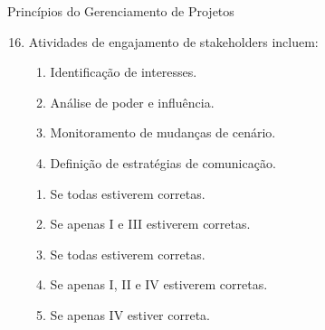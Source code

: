 \documentclass{beamer}
\begin{document}
\begin{frame}{Princípios do Gerenciamento de Projetos}
	\begin{enumerate}
		\setcounter{enumi}{15}
		\justifying
		\item Atividades de engajamento de stakeholders incluem:
		\begin{enumerate}[I]
			\item Identificação de interesses.
			\item Análise de poder e influência.
			\item Monitoramento de mudanças de cenário.
			\item Definição de estratégias de comunicação.
		\end{enumerate}
		\begin{enumerate}[a]
			\item Se todas estiverem corretas.
			\item Se apenas I e III estiverem corretas.
			\item \alert<2>{Se todas estiverem corretas.}
			\item Se apenas I, II e IV estiverem corretas.
			\item Se apenas IV estiver correta.
		\end{enumerate}
	\end{enumerate}
\end{frame}
\end{document}
